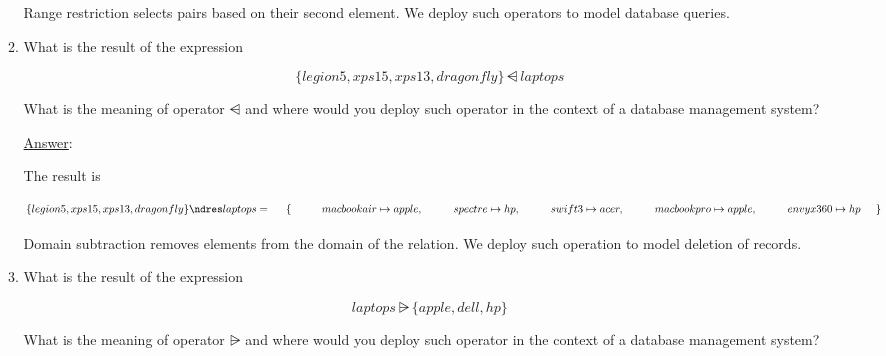\documentclass[12pt]{article}
\begin{document}
\begin{itemize}
\begin{enumerate}
                        \noindent Range restriction selects pairs based on their second element. We deploy such operators to model database queries.


                  \item What is the result of the expression

                        \[ \{ legion5, xps15, xps13, dragonfly \} \ndres laptops \]

                        \noindent What is the meaning of operator $\ndres$ and where would you deploy such operator in the context of a database management system?

                        \noindent \underline{Answer}:

                        \noindent \noindent The result is

                        \[ \{ legion5, xps15, xps13, dragonfly \} \ndres laptops = \\
                              \hspace{5mm} \{ \\
                              \hspace{10mm} macbookair \mapsto apple,\\
                              \hspace{10mm} spectre \mapsto hp,\\
                              \hspace{10mm} swift3 \mapsto acer,\\
                              \hspace{10mm} macbookpro \mapsto apple,\\
                              \hspace{10mm} envyx360 \mapsto hp\\
                              \hspace{5mm} \}
                        \]

                        \noindent  Domain subtraction removes elements from the domain of the relation. We deploy such operation to model deletion of records.


                  \item What is the result of the expression

                        \[ laptops \nrres \{ apple, dell, hp \} \]

                        \noindent What is the meaning of operator $\nrres$ and where would you deploy such operator in the context of a database management system?


\end{enumerate}
\end{itemize}
\end{document}

